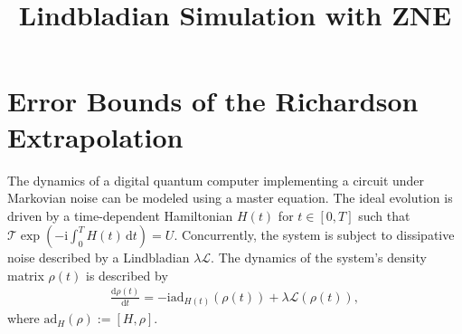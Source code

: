 \documentclass[11pt]{article}
\title{Lindbladian Simulation with ZNE}
\author{}
\date{}
\renewcommand{\i}{\mathrm{i}}
\renewcommand{\d}{\mathrm{d}}
\renewcommand{\L}{\mathcal{L}}
\newcommand{\ad}{\mathrm{ad}}
\newcommand{\T}{\mathcal{T}}
\begin{document}
\maketitle
\section{Error Bounds of the Richardson Extrapolation}
The dynamics of a digital quantum computer implementing a circuit under Markovian noise can be modeled using a master equation. The ideal evolution is driven by a time-dependent Hamiltonian $H(t)$ for $t\in[0,T]$ such that $\T \exp(-\i\int_{0}^T H(t)\,\d t)=U$. Concurrently, the system is subject to dissipative noise described by a Lindbladian $\lambda \L$. The dynamics of the system's density matrix $\rho(t)$ is described by \begin{align*}
    \frac{\d \rho(t)}{\d t} = -\i\ad_{H(t)}(\rho(t))+\lambda \L(\rho(t)),
\end{align*}
where $\ad_H(\rho) :=[H,\rho]$.
\end{document}
